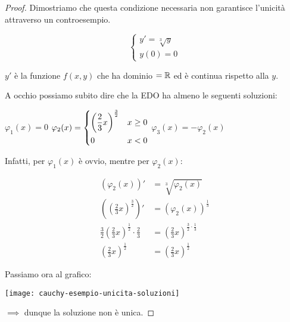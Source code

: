 \begin{proof}
    Dimostriamo che questa condizione necessaria non garantisce l'unicità attraverso un controesempio.

    \begin{equation*}
        \begin{cases*}
            y' = \sqrt[3]{y} \\
            y(0) = 0
        \end{cases*}
    \end{equation*}

    \(y'\) è la funzione \(f(x,y)\) che ha dominio \(= \mathbb{R} \) ed è continua rispetto alla \(y\).

    A occhio possiamo subito dire che la EDO ha almeno le seguenti soluzioni:

    \vspace{0.5cm}
    \hspace{1cm}
    \(\varphi_{1}(x) = 0\)
    \hfill
    \(\varphi_{2}(x) =
    \begin{dcases}
        {\left( \frac{2}{3} x \right)}^{\frac{3}{2}} & x \geq{} 0 \\
        0                                            & x < 0
    \end{dcases}\)
    \hfill
    \(\varphi_{3}(x) = -\varphi_{2}(x) \)
    \hspace{1cm}
    \vspace{0.5cm}

    Infatti, per \(\varphi_{1}(x)\) è ovvio, mentre per \(\varphi_{2}(x)\):

    \begin{align*}
        \left( \varphi_{2}(x) \right)'                                          & = \sqrt[3]{\varphi_{2}(x)}                                       \\
        \left( {\left( \frac{2}{3} x \right)}^{\frac{3}{2}} \right)'            & = {\left( \varphi_{2}(x) \right)}^{\frac{1}{3}}                  \\
        \frac{3}{2} {\left(\frac{2}{3}x\right)}^{\frac{1}{2}} \cdot \frac{2}{3} & = {\left( \frac{2}{3} x \right)}^{\frac{3}{2} \cdot \frac{1}{3}} \\
        {\left(\frac{2}{3}x\right)}^{\frac{1}{2}}                               & = {\left(\frac{2}{3}x\right)}^{\frac{1}{2}}
    \end{align*}

    Passiamo ora al grafico:

    \begin{center}
        \texttt{[image: cauchy-esempio-unicita-soluzioni]}
    \end{center}

    \(\implies{}\) dunque la soluzione non è unica.

\end{proof}


